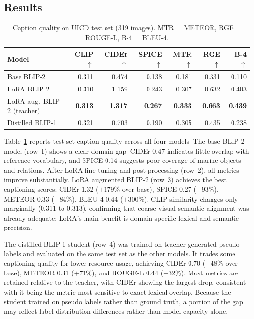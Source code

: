 \documentclass[journal]{IEEEtran}
\begin{document}
\FloatBarrier
\subsection{Results}

\begin{table}[!t]
\caption{Caption quality on UICD test set (319 images). MTR = METEOR, RGE = ROUGE-L, B-4 = BLEU-4.}
\label{tab:results}
\centering
\small
\setlength{\tabcolsep}{6pt}
\begin{tabular}{@{}l r r r r r r@{}}
\toprule
\textbf{Model} & \textbf{CLIP} $\uparrow$ & \textbf{CIDEr} $\uparrow$ & \textbf{SPICE} $\uparrow$ & \textbf{MTR} $\uparrow$ & \textbf{RGE} $\uparrow$ & \textbf{B-4} $\uparrow$ \\
\midrule
Base BLIP-2          & 0.311 & 0.474 & 0.138 & 0.181 & 0.331 & 0.110 \\
LoRA BLIP-2          & 0.310 & 1.159 & 0.243 & 0.307 & 0.632 & 0.403 \\
LoRA aug.\ BLIP-2 (teacher) & \textbf{0.313} & \textbf{1.317} & \textbf{0.267} & \textbf{0.333} & \textbf{0.663} & \textbf{0.439} \\
Distilled BLIP-1     & 0.321 & 0.703 & 0.190 & 0.305 & 0.435 & 0.238 \\
\bottomrule
\end{tabular}
\end{table}

Table~\ref{tab:results} reports test set caption quality across all four models. The base BLIP-2 model (row~1) shows a clear domain gap: CIDEr 0.47 indicates little overlap with reference vocabulary, and SPICE 0.14 suggests poor coverage of marine objects and relations. After LoRA fine tuning and post processing (row~2), all metrics improve substantially. LoRA augmented BLIP-2 (row~3) achieves the best captioning scores: CIDEr 1.32 ($+179\%$ over base), SPICE 0.27 ($+93\%$), METEOR 0.33 ($+84\%$), BLEU-4 0.44 ($+300\%$). CLIP similarity changes only marginally (0.311 to 0.313), confirming that coarse visual semantic alignment was already adequate; LoRA's main benefit is domain specific lexical and semantic precision.

The distilled BLIP-1 student (row~4) was trained on teacher generated pseudo labels and evaluated on the same test set as the other models. It trades some captioning quality for lower resource usage, achieving CIDEr 0.70 ($+48\%$ over base), METEOR 0.31 ($+71\%$), and ROUGE-L 0.44 ($+32\%$). Most metrics are retained relative to the teacher, with CIDEr showing the largest drop, consistent with it being the metric most sensitive to exact lexical overlap. Because the student trained on pseudo labels rather than ground truth, a portion of the gap may reflect label distribution differences rather than model capacity alone.
\end{document}
